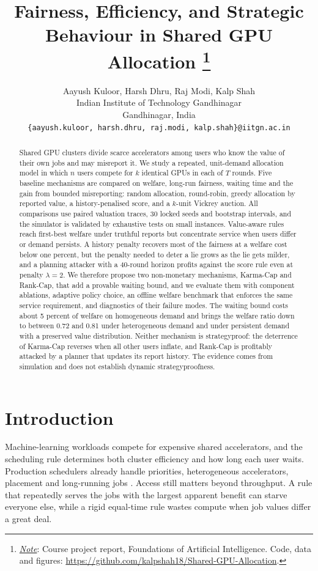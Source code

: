 \documentclass{article}
\title{Fairness, Efficiency, and Strategic Behaviour in Shared GPU Allocation
\thanks{\textit{\underline{Note}}: Course project report, Foundations of Artificial Intelligence. 
Code, data and figures: \url{https://github.com/kalpshah18/Shared-GPU-Allocation}.}
}
\author{
  Aayush Kuloor, Harsh Dhru, Raj Modi, Kalp Shah \\
  Indian Institute of Technology Gandhinagar \\
  Gandhinagar, India \\
  \texttt{\{aayush.kuloor, harsh.dhru, raj.modi, kalp.shah\}@iitgn.ac.in} \\
}
\theoremstyle{plain}
\theoremstyle{definition}
\begin{document}
\maketitle

\begin{abstract}
Shared GPU clusters divide scarce accelerators among users who know the value of their own jobs and may misreport it.
We study a repeated, unit-demand allocation model in which $n$ users compete for $k$ identical GPUs in each of $T$ rounds.
Five baseline mechanisms are compared on welfare, long-run fairness, waiting time and the gain from bounded misreporting: random allocation, round-robin, greedy allocation by reported value, a history-penalised score, and a $k$-unit Vickrey auction.
All comparisons use paired valuation traces, 30 locked seeds and bootstrap intervals, and the simulator is validated by exhaustive tests on small instances.
Value-aware rules reach first-best welfare under truthful reports but concentrate service when users differ or demand persists.
A history penalty recovers most of the fairness at a welfare cost below one percent, but the penalty needed to deter a lie grows as the lie gets milder, and a planning attacker with a 40-round horizon profits against the score rule even at penalty $\lambda=2$.
We therefore propose two non-monetary mechanisms, Karma-Cap and Rank-Cap, that add a provable waiting bound, and we evaluate them with component ablations, adaptive policy choice, an offline welfare benchmark that enforces the same service requirement, and diagnostics of their failure modes.
The waiting bound costs about 5 percent of welfare on homogeneous demand and brings the welfare ratio down to between 0.72 and 0.81 under heterogeneous demand and under persistent demand with a preserved value distribution.
Neither mechanism is strategyproof: the deterrence of Karma-Cap reverses when all other users inflate, and Rank-Cap is profitably attacked by a planner that updates its report history.
The evidence comes from simulation and does not establish dynamic strategyproofness.
\end{abstract}


\section{Introduction}
\label{sec:intro}

Machine-learning workloads compete for expensive shared accelerators, and the scheduling rule determines both cluster efficiency and how long each user waits.
Production schedulers already handle priorities, heterogeneous accelerators, placement and long-running jobs \cite{gu2019tiresias,narayanan2020gavel}.
Access still matters beyond throughput.
A rule that repeatedly serves the jobs with the largest apparent benefit can starve everyone else, while a rigid equal-time rule wastes compute when job values differ a great deal.
\end{document}
